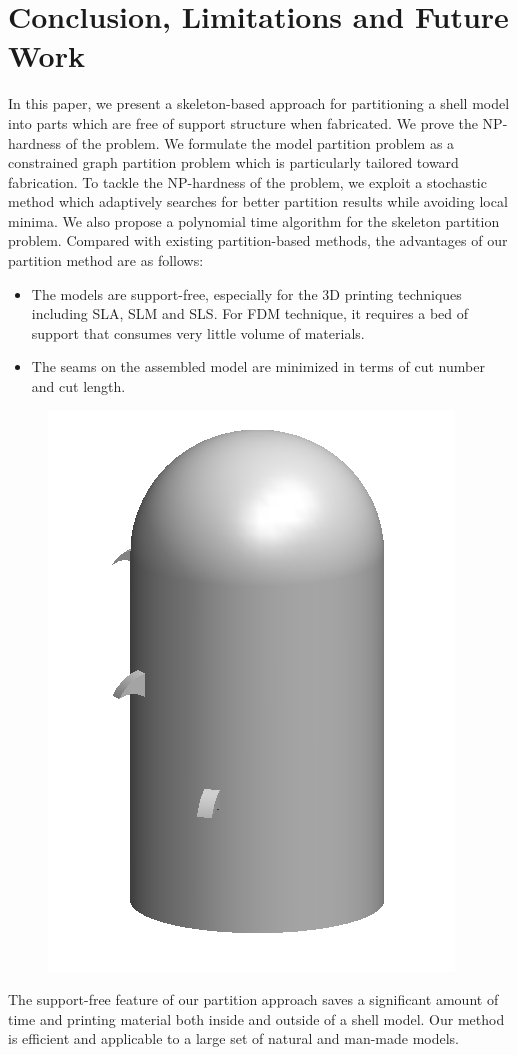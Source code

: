 \section{Conclusion, Limitations and Future Work}

In this paper, we present a skeleton-based approach for partitioning a shell model into parts which are free of support structure when fabricated. We prove the NP-hardness of the problem. We formulate the model partition problem as a constrained graph partition problem which is particularly tailored toward fabrication. To tackle the NP-hardness of the problem, we exploit a stochastic method which adaptively searches for better partition results while avoiding local minima. We also propose a polynomial time algorithm for the skeleton partition problem. 
Compared with existing partition-based methods, the advantages of our partition method are as follows:

\begin{itemize}
 \item The models are support-free, especially for the 3D printing techniques including SLA, SLM and SLS. For FDM technique, it requires a bed of support that consumes very little volume of materials.
\item The seams on the assembled model are minimized in terms of cut number and cut length.
\end{itemize}

\begin{figure} %
\vspace{-.1in}
\includegraphics[width=0.3\columnwidth]{figs/limit.png}
\end{figure}
The support-free feature of our partition approach saves a significant amount of time and printing material both inside and outside of a shell model. Our method is efficient and applicable to a large set of natural and man-made models.

